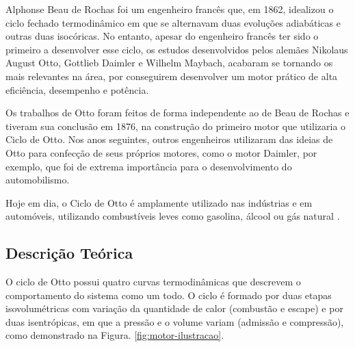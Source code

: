 \documentclass[10pt, conference, letterpaper]{IEEEtran}
\begin{document}
\hspace{0.5cm}Alphonse Beau de Rochas foi um engenheiro francês que, em 1862, idealizou o ciclo fechado termodinâmico em que se alternavam duas evoluções adiabáticas e outras duas isocóricas. No entanto, apesar do engenheiro francês ter sido o primeiro a desenvolver esse ciclo, os estudos desenvolvidos pelos alemães Nikolaus August Otto, Gottlieb Daimler e Wilhelm Maybach, acabaram se tornando os mais relevantes na área, por conseguirem desenvolver um motor prático de alta eficiência, desempenho e potência.

\hspace{0.5cm}Os trabalhos de Otto foram feitos de forma independente ao de Beau de Rochas e tiveram sua conclusão em 1876, na construção do primeiro motor que utilizaria o Ciclo de Otto. Nos anos seguintes, outros engenheiros utilizaram das ideias de Otto para confecção de seus próprios motores, como o motor Daimler, por exemplo, que foi de extrema importância para o desenvolvimento do automobilismo.

\hspace{0.5cm}Hoje em dia, o Ciclo de Otto é amplamente utilizado nas indústrias e em automóveis, utilizando combustíveis leves como gasolina, álcool ou gás natural \cite{reference2}.
	
\subsection{Descrição Teórica}\label{intro:des-teorica}

\hspace{0.5cm}O ciclo de Otto possui quatro curvas termodinâmicas que descrevem o comportamento do sistema como um todo. O ciclo é formado por duas etapas isovolumétricas com variação da quantidade de calor (combustão e escape) e por duas isentrópicas, em que a pressão e o volume variam (admissão e compressão), 
 como demonstrado na Figura. \ref{fig:motor-ilustracao}. 
\end{document}
